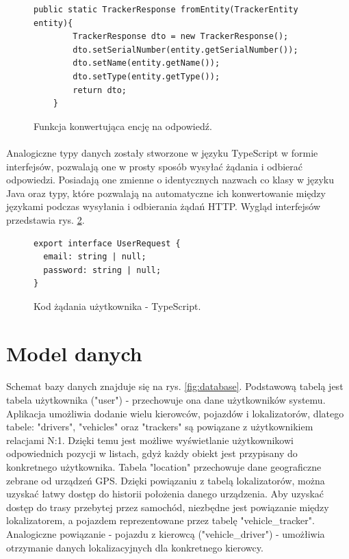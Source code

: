 \begin{figure}
\centering
\begin{lstlisting}
public static TrackerResponse fromEntity(TrackerEntity entity){
        TrackerResponse dto = new TrackerResponse();
        dto.setSerialNumber(entity.getSerialNumber());
        dto.setName(entity.getName());
        dto.setType(entity.getType());
        return dto;
    }
\end{lstlisting}
\caption{Funkcja konwertująca encję na odpowiedź.}
\label{fig:kod:mapper}
\end{figure}

\paragraph{}
Analogiczne typy danych zostały stworzone w języku TypeScript w formie interfejsów, pozwalają one w prosty sposób wysyłać żądania i odbierać odpowiedzi. Posiadają one zmienne o identycznych nazwach co klasy w języku Java oraz typy, które pozwalają na automatyczne ich konwertowanie między językami podczas wysyłania i odbierania żądań HTTP. Wygląd interfejsów przedstawia rys. \ref{fig:kod:dto}.

\begin{figure}
\centering
\begin{lstlisting}
export interface UserRequest {
  email: string | null;
  password: string | null;
}
\end{lstlisting}
\caption{Kod żądania użytkownika - TypeScript.}
\label{fig:kod:dto}
\end{figure}

\section{Model danych}
\paragraph{}
Schemat bazy danych znajduje się na rys. \ref{fig:database}. Podstawową tabelą jest tabela użytkownika ("user") - przechowuje ona dane użytkowników systemu. Aplikacja umożliwia dodanie wielu kierowców, pojazdów i lokalizatorów, dlatego tabele: "drivers", "vehicles" oraz "trackers" są powiązane z użytkownikiem relacjami N:1. Dzięki temu jest możliwe wyświetlanie użytkownikowi odpowiednich pozycji w listach, gdyż każdy obiekt jest przypisany do konkretnego użytkownika. Tabela "location" przechowuje dane geograficzne zebrane od urządzeń GPS. Dzięki powiązaniu z tabelą lokalizatorów, można uzyskać łatwy dostęp do historii położenia danego urządzenia. Aby uzyskać dostęp do trasy przebytej przez samochód, niezbędne jest powiązanie między lokalizatorem, a pojazdem reprezentowane przez tabelę "vehicle\_tracker". Analogiczne powiązanie - pojazdu z kierowcą ("vehicle\_driver") - umożłiwia otrzymanie danych lokalizacyjnych dla konkretnego kierowcy.

